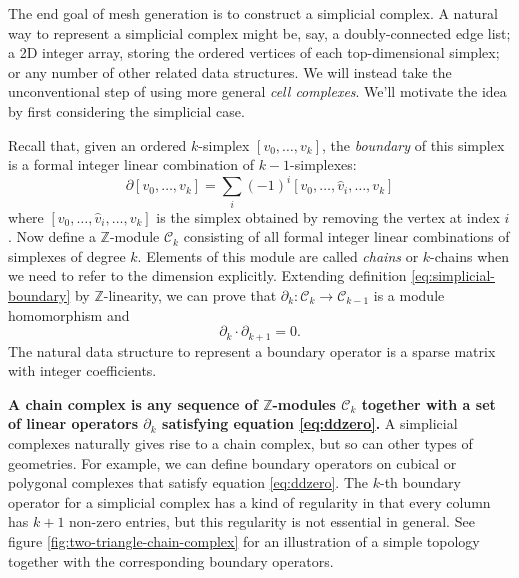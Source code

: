 \documentclass[twocolumn]{article}
\begin{document}
The end goal of mesh generation is to construct a simplicial complex.
A natural way to represent a simplicial complex might be, say, a doubly-connected edge list; a 2D integer array, storing the ordered vertices of each top-dimensional simplex; or any number of other related data structures.
We will instead take the unconventional step of using more general \emph{cell complexes}.
We'll motivate the idea by first considering the simplicial case.

Recall that, given an ordered $k$-simplex $[v_0, \ldots, v_k]$, the \emph{boundary} of this simplex is a formal integer linear combination of $k - 1$-simplexes:
\begin{equation}
    \partial[v_0, \ldots, v_k] = \sum_i(-1)^i[v_0, \ldots, \hat v_i, \ldots, v_k]
    \label{eq:simplicial-boundary}
\end{equation}
where $[v_0, \ldots, \hat v_i, \ldots, v_k]$ is the simplex obtained by removing the vertex at index $i$.
Now define a $\mathbb{Z}$-module $\mathscr{C}_k$ consisting of all formal integer linear combinations of simplexes of degree $k$.
Elements of this module are called \emph{chains} or $k$-chains when we need to refer to the dimension explicitly.
Extending definition \eqref{eq:simplicial-boundary} by $\mathbb{Z}$-linearity, we can prove that $\partial_k : \mathscr{C}_k \to \mathscr{C}_{k - 1}$ is a module homomorphism and
\begin{equation}
    \partial_k\cdot\partial_{k + 1} = 0.
    \label{eq:ddzero}
\end{equation}
The natural data structure to represent a boundary operator is a sparse matrix with integer coefficients.

\textbf{A chain complex is any sequence of $\mathbb{Z}$-modules $\mathscr{C}_k$ together with a set of linear operators $\partial_k$ satisfying equation \eqref{eq:ddzero}.}
A simplicial complexes naturally gives rise to a chain complex, but so can other types of geometries.
For example, we can define boundary operators on cubical or polygonal complexes that satisfy equation \eqref{eq:ddzero}.
The $k$-th boundary operator for a simplicial complex has a kind of regularity in that every column has $k + 1$ non-zero entries, but this regularity is not essential in general.
See figure \ref{fig:two-triangle-chain-complex} for an illustration of a simple topology together with the corresponding boundary operators.
\end{document}
